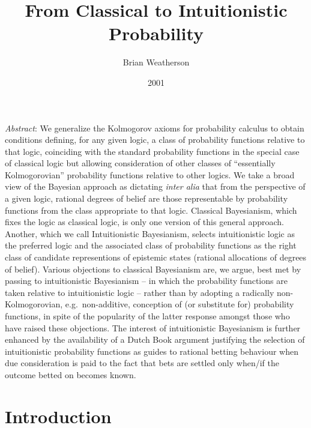 \documentclass[
  11pt,
  letterpaper,
  DIV=11,
  numbers=noendperiod,
  twoside]{scrartcl}
\title{From Classical to Intuitionistic Probability}
\author{Brian Weatherson}
\date{2001}
\renewenvironment{abstract}
 {\vspace{-1.25cm}
 \quotation\small\noindent\emph{Abstract}:}
 {\endquotation}
\renewenvironment{abstract}
 {\quotation\small\noindent\emph{Abstract}:}
 {\endquotation\vspace{-0.02cm}}
\begin{document}
\maketitle
\begin{abstract}
We generalize the Kolmogorov axioms for probability calculus to obtain
conditions defining, for any given logic, a class of probability
functions relative to that logic, coinciding with the standard
probability functions in the special case of classical logic but
allowing consideration of other classes of ``essentially Kolmogorovian''
probability functions relative to other logics. We take a broad view of
the Bayesian approach as dictating \emph{inter alia} that from the
perspective of a given logic, rational degrees of belief are those
representable by probability functions from the class appropriate to
that logic. Classical Bayesianism, which fixes the logic as classical
logic, is only one version of this general approach. Another, which we
call Intuitionistic Bayesianism, selects intuitionistic logic as the
preferred logic and the associated class of probability functions as the
right class of candidate representions of epistemic states (rational
allocations of degrees of belief). Various objections to classical
Bayesianism are, we argue, best met by passing to intuitionistic
Bayesianism -- in which the probability functions are taken relative to
intuitionistic logic -- rather than by adopting a radically
non-Kolmogorovian, e.g.~non-additive, conception of (or substitute for)
probability functions, in spite of the popularity of the latter response
amongst those who have raised these objections. The interest of
intuitionistic Bayesianism is further enhanced by the availability of a
Dutch Book argument justifying the selection of intuitionistic
probability functions as guides to rational betting behaviour when due
consideration is paid to the fact that bets are settled only when/if the
outcome betted on becomes known.
\end{abstract}


\section{Introduction}\label{introduction}
\end{document}
